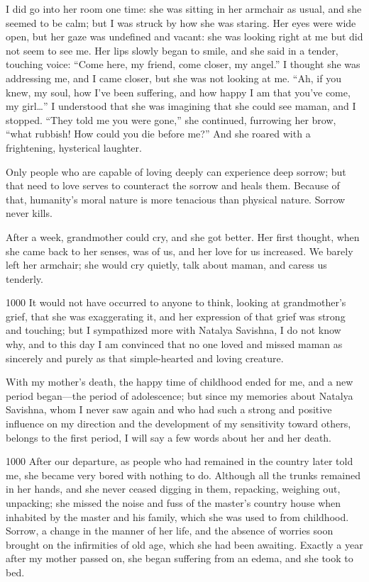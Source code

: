I did go into her room one time: she was sitting in her armchair as usual, and she seemed to be calm; but I was struck by how she was staring. Her eyes were wide open, but her gaze was undefined and vacant: she was looking right at me but did not seem to see me. Her lips slowly began to smile, and she said in a tender, touching voice: ``Come here, my friend, come closer, my angel.'' I thought she was addressing me, and I came closer, but she was not looking at me. ``Ah, if you knew, my soul, how I've been suffering, and how happy I am that you've come, my girl\ldots{}'' I understood that she was imagining that she could see maman, and I stopped. ``They told me you were gone,'' she continued, furrowing her brow, ``what rubbish! How could you die before me?'' And she roared with a frightening, hysterical laughter.

Only people who are capable of loving deeply can experience deep sorrow; but that need to love serves to counteract the sorrow and heals them. Because of that, humanity's moral nature is more tenacious than physical nature. Sorrow never kills.

After a week, grandmother could cry, and she got better. Her first thought, when she came back to her senses, was of us, and her love for us increased. We barely left her armchair; she would cry quietly, talk about maman, and caress us tenderly.

\begin{tolerant}{1000}
It would not have occurred to anyone to think, looking at grandmother's grief, that she was exaggerating it, and her expression of that grief was strong and touching; but I sympathized more with Natalya Savishna, I do not know why, and to this day I am convinced that no one loved and missed maman as sincerely and purely as that simple-hearted and loving creature.
\end{tolerant}

With my mother's death, the happy time of childhood ended for me, and a new period began---the period of adolescence; but since my memories about Natalya Savishna, whom I never saw again and who had such a strong and positive influence on my direction and the development of my sensitivity toward others, belongs to the first period, I will say a few words about her and her death.

\begin{tolerant}{1000}
After our departure, as people who had remained in the country later told me, she became very bored with nothing to do. Although all the trunks remained in her hands, and she never ceased digging in them, repacking, weighing out, unpacking; she missed the noise and fuss of the master's country house when inhabited by the master and his family, which she was used to from childhood. Sorrow, a change in the manner of her life, and the absence of worries soon brought on the infirmities of old age, which she had been awaiting. Exactly a year after my mother passed on, she began suffering from an edema, and she took to bed.
\end{tolerant}

